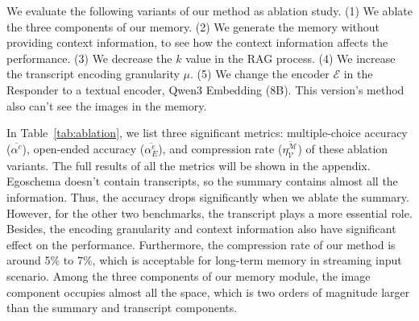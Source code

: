 We evaluate the following variants of our method as ablation study.
(1) We ablate the three components of our memory.
(2) We generate the memory without providing context information, to see how the context information affects the performance.
(3) We decrease the $k$ value in the RAG process. 
(4) We increase the transcript encoding granularity $\mu$.
(5) We change the encoder $\mathcal{E}$ in the Responder to a textual encoder, Qwen3 Embedding (8B).
This version's method also can't see the images in the memory.

In Table~\ref{tab:ablation}, we list three significant metrics: multiple-choice accuracy ($\overline{\alpha^c}$), open-ended accuracy ($\overline{\alpha^e_E}$), and compression rate ($\overline{\eta^{\mathcal{M}}_{\mathcal{V}}}$) of these ablation variants. The full results of all the metrics will be shown in the appendix.
Egoschema doesn't contain transcripts, so the summary contains almost all the information. Thus, the accuracy drops significantly when we ablate the summary.
However, for the other two benchmarks, the transcript plays a more essential role.
Besides, the encoding granularity and context information also have significant effect on the performance.
Furthermore, the compression rate of our method is around 5\% to 7\%, which is acceptable for long-term memory in streaming input scenario.
Among the three components of our memory module, the image component occupies almost all the space, which is two orders of magnitude larger than the summary and transcript components.
